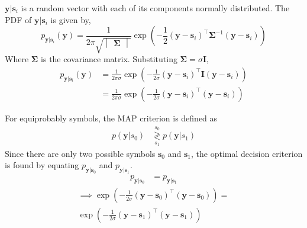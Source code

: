 \documentclass[journal,10pt,twocolumn]{IEEEtran}
\newcounter{Chapcounter}
\numberwithin{equation}{subsection}
\numberwithin{figure}{subsection}
\renewcommand\thesection{\theChapcounter.\arabic{section}}
\providecommand{\brak}[1]{\ensuremath{\left(#1\right)}}
\providecommand{\dec}[2]{\ensuremath{\overset{#1}{\underset{#2}{\gtrless}}}}
\newcommand{\mydet}[1]{\ensuremath{\begin{vmatrix}#1\end{vmatrix}}}
\let\vec\mathbf
\renewcommand\thesection{\arabic{section}}
\renewcommand\thesubsection{\thesection.\arabic{subsection}}
\begin{document}
\begin{enumerate}[label=\thesubsection.\arabic*,ref=\thesubsection.\arabic{figure}]
$\vec{y}|\vec{s}_i$ is a random vector with each of its components normally distributed. The PDF of $\vec{y}|\vec{s}_i$ is given by,
\begin{equation}
	p_{\vec{y}|\vec{s}_i}\brak{\vec{y}} = \frac{1}{2\pi\sqrt{\mydet{\vec{\Sigma}}}} \exp\brak{-\frac{1}{2}\brak{\vec{y}-\vec{s}_i}^\top \vec{\Sigma}^{-1} \brak{\vec{y}-\vec{s}_i}}
\end{equation}
Where $\vec{\Sigma}$ is the covariance matrix. Substituting $\vec{\Sigma} = \sigma \vec{I}$,
\begin{align}
	p_{\vec{y}|\vec{s}_i}\brak{\vec{y}} &= \frac{1}{2 \pi \sigma} \exp\brak{-\frac{1}{2 \sigma}\brak{\vec{y}-\vec{s}_i}^\top \vec{I} \brak{\vec{y}-\vec{s}_i}}\\
	&= \frac{1}{2 \pi \sigma} \exp\brak{-\frac{1}{2 \sigma}\brak{\vec{y}-\vec{s}_i}^\top \brak{\vec{y}-\vec{s}_i}}
\end{align}
  
         For equiprobably symbols, the MAP criterion is defined as
        \begin{align}
        \label{eq:map_bfsk_dec}
        p\brak{\vec{y}|s_0} &\dec{s_0}{s_1} p\brak{\vec{y}|s_1}
        \end{align}  
         Since there are only two possible symbols %
$\vec{s}_0$ and $\vec{s}_1$, the optimal decision criterion is found by equating $p_{\vec{y}|\vec{s}_0}$ and $p_{\vec{y}|\vec{s}_1}$.
\begin{align}
	p_{\vec{y}|\vec{s}_0} &= p_{\vec{y}|\vec{s}_1}
\end{align}
\begin{multline}
	\implies \exp\brak{-\frac{1}{2 \sigma}\brak{\vec{y}-\vec{s}_0}^\top \brak{\vec{y}-\vec{s}_0}} = \\
	\exp\brak{-\frac{1}{2 \sigma}\brak{\vec{y}-\vec{s}_1}^\top \brak{\vec{y}-\vec{s}_1}}
\end{multline}
	

\end{enumerate}
\end{document}
